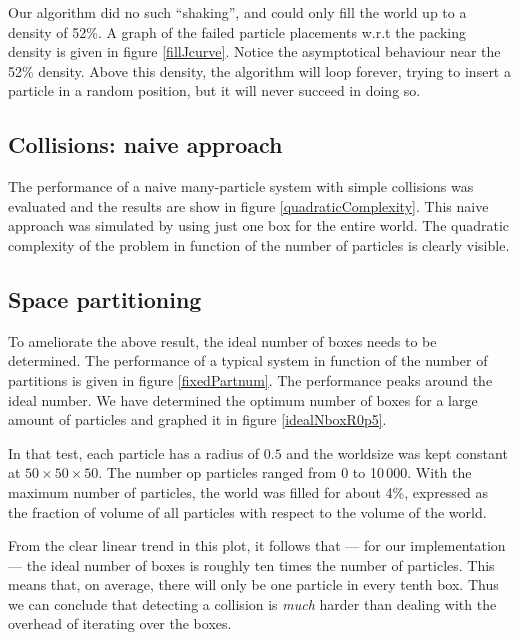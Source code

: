 
Our algorithm did no such ``shaking'', and could only fill the world up to 
a density of 52\%. A graph of the failed particle placements w.r.t the 
packing density is given in figure \ref{fillJcurve}. Notice the 
asymptotical behaviour near the 52\% density. Above this density, the 
algorithm will loop forever, trying to insert a particle in a random position, 
but it will never succeed in doing so.

\subsection{Collisions: naive approach}
The performance of a naive many-particle system with simple collisions was 
evaluated and the results are show in figure \ref{quadraticComplexity}.  This 
naive approach was simulated by using just one box for the entire world. The 
quadratic complexity of the problem in function of the number of particles is 
clearly visible.




\subsection{Space partitioning}
To ameliorate the above result, the ideal number of boxes needs to be 
determined.  The performance of a typical system in function of the number of 
partitions is given in figure \ref{fixedPartnum}. The performance peaks around 
the ideal number.  We have determined the optimum number of boxes for a large 
amount of particles and graphed it in figure \ref{idealNboxR0p5}.



In that test, each particle has a radius of $0.5$ and the worldsize was 
kept constant at $50 \times 50 \times 50$. The number op particles ranged 
from 0 to 10\,000. With the maximum number of particles, the world was 
filled for about 4\%, expressed as the fraction of volume of all particles 
with respect to the volume of the world.

From the clear linear trend in this plot, it follows that --- for our 
implementation  --- the ideal number of boxes is roughly ten times the 
number of particles. This means that, on average, there will only be one 
particle in every tenth box. Thus we can conclude that detecting a 
collision is \emph{much} harder than dealing with the overhead of iterating 
over the boxes.

